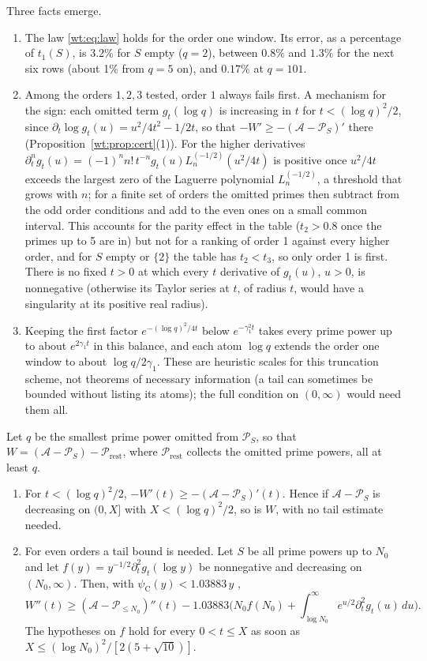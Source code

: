 Three facts emerge.
\begin{enumerate}
\item The law \eqref{wt:eq:law} holds for the order one window. Its error, as a percentage of $t_1(S)$, is $3.2\%$ for $S$ empty ($q=2$), between $0.8\%$ and $1.3\%$ for the next six rows (about 1\% from $q=5$ on), and $0.17\%$ at $q=101$.
\item Among the orders $1,2,3$ tested, order $1$ always fails first. A mechanism for the sign: each omitted term $g_t(\log q)$ is increasing in $t$ for $t<(\log q)^2/2$, since $\partial_t\log g_t(u)=u^2/4t^2-1/2t$, so that $-W'\ge-(\mathcal A-\mathcal P_S)'$ there (Proposition~\ref{wt:prop:cert}(1)). For the higher derivatives $\partial_t^ng_t(u)=(-1)^nn!\,t^{-n}g_t(u)L_n^{(-1/2)}(u^2/4t)$ is positive once $u^2/4t$ exceeds the largest zero of the Laguerre polynomial $L_n^{(-1/2)}$, a threshold that grows with $n$; for a finite set of orders the omitted primes then subtract from the odd order conditions and add to the even ones on a small common interval. This accounts for the parity effect in the table ($t_2>0.8$ once the primes up to 5 are in) but not for a ranking of order 1 against every higher order, and for $S$ empty or $\{2\}$ the table has $t_2<t_3$, so only order 1 is first. There is no fixed $t>0$ at which every $t$ derivative of $g_t(u)$, $u>0$, is nonnegative (otherwise its Taylor series at $t$, of radius $t$, would have a singularity at its positive real radius).
\item Keeping the first factor $e^{-(\log q)^2/4t}$ below $e^{-\gamma_1^2t}$ takes every prime power up to about $e^{2\gamma_1t}$ in this balance, and each atom $\log q$ extends the order one window to about $\log q/2\gamma_1$. These are heuristic scales for this truncation scheme, not theorems of necessary information (a tail can sometimes be bounded without listing its atoms); the full condition on $(0,\infty)$ would need them all.
\end{enumerate}



\begin{proposition}\label{wt:prop:cert}
Let $q$ be the smallest prime power omitted from $\mathcal P_S$, so that $W=(\mathcal A-\mathcal P_S)-\mathcal P_{\mathrm{rest}}$, where $\mathcal P_{\mathrm{rest}}$ collects the omitted prime powers, all at least $q$.
\begin{enumerate}
\item[(1)] For $t<(\log q)^2/2$, $-W'(t)\ge-(\mathcal A-\mathcal P_S)'(t)$. Hence if $\mathcal A-\mathcal P_S$ is decreasing on $(0,X]$ with $X<(\log q)^2/2$, so is $W$, with no tail estimate needed.
\item[(2)] For even orders a tail bound is needed. Let $S$ be all prime powers up to $N_0$ and let $f(y)=y^{-1/2}\partial_t^2g_t(\log y)$ be nonnegative and decreasing on $(N_0,\infty)$. Then, with $\psi_{\mathrm C}(y)<1.03883\,y$ \cite{RS62},
\[
W''(t)\ge(\mathcal A-\mathcal P_{\le N_0})''(t)-1.03883\Big(N_0f(N_0)+\int_{\log N_0}^\infty e^{u/2}\partial_t^2g_t(u)\,du\Big).
\]
The hypotheses on $f$ hold for every $0<t\le X$ as soon as $X\le(\log N_0)^2/[2(5+\sqrt{10})]$.
\end{enumerate}
\end{proposition}


